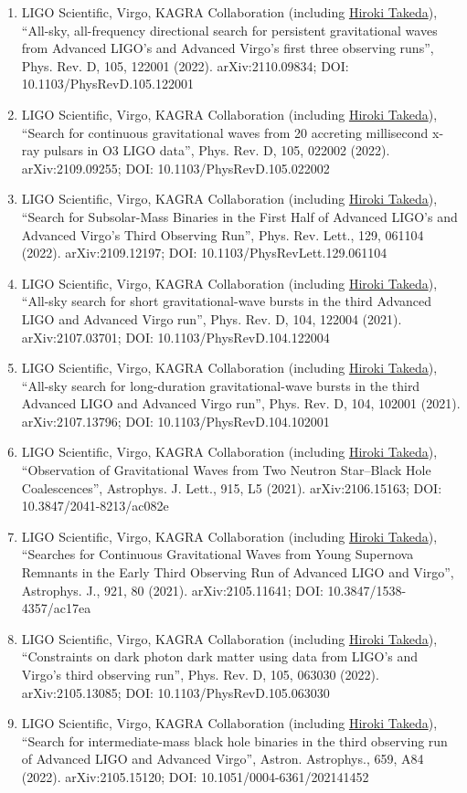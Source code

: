 \documentclass[uplatex, 12pt]{article}
\begin{document}
\begin{enumerate}
\item LIGO Scientific, Virgo, KAGRA Collaboration (including \uline{Hiroki Takeda}), “All-sky, all-frequency directional search for persistent gravitational waves from Advanced LIGO's and Advanced Virgo's first three observing runs”, Phys. Rev. D, 105, 122001 (2022). arXiv:2110.09834; DOI: 10.1103/PhysRevD.105.122001
\item LIGO Scientific, Virgo, KAGRA Collaboration (including \uline{Hiroki Takeda}), “Search for continuous gravitational waves from 20 accreting millisecond x-ray pulsars in O3 LIGO data”, Phys. Rev. D, 105, 022002 (2022). arXiv:2109.09255; DOI: 10.1103/PhysRevD.105.022002
\item LIGO Scientific, Virgo, KAGRA Collaboration (including \uline{Hiroki Takeda}), “Search for Subsolar-Mass Binaries in the First Half of Advanced LIGO's and Advanced Virgo's Third Observing Run”, Phys. Rev. Lett., 129, 061104 (2022). arXiv:2109.12197; DOI: 10.1103/PhysRevLett.129.061104
\item LIGO Scientific, Virgo, KAGRA Collaboration (including \uline{Hiroki Takeda}), “All-sky search for short gravitational-wave bursts in the third Advanced LIGO and Advanced Virgo run”, Phys. Rev. D, 104, 122004 (2021). arXiv:2107.03701; DOI: 10.1103/PhysRevD.104.122004
\item LIGO Scientific, Virgo, KAGRA Collaboration (including \uline{Hiroki Takeda}), “All-sky search for long-duration gravitational-wave bursts in the third Advanced LIGO and Advanced Virgo run”, Phys. Rev. D, 104, 102001 (2021). arXiv:2107.13796; DOI: 10.1103/PhysRevD.104.102001
\item LIGO Scientific, Virgo, KAGRA Collaboration (including \uline{Hiroki Takeda}), “Observation of Gravitational Waves from Two Neutron Star--Black Hole Coalescences”, Astrophys. J. Lett., 915, L5 (2021). arXiv:2106.15163; DOI: 10.3847/2041-8213/ac082e
\item LIGO Scientific, Virgo, KAGRA Collaboration (including \uline{Hiroki Takeda}), “Searches for Continuous Gravitational Waves from Young Supernova Remnants in the Early Third Observing Run of Advanced LIGO and Virgo”, Astrophys. J., 921, 80 (2021). arXiv:2105.11641; DOI: 10.3847/1538-4357/ac17ea
\item LIGO Scientific, Virgo, KAGRA Collaboration (including \uline{Hiroki Takeda}), “Constraints on dark photon dark matter using data from LIGO's and Virgo's third observing run”, Phys. Rev. D, 105, 063030 (2022). arXiv:2105.13085; DOI: 10.1103/PhysRevD.105.063030
\item LIGO Scientific, Virgo, KAGRA Collaboration (including \uline{Hiroki Takeda}), “Search for intermediate-mass black hole binaries in the third observing run of Advanced LIGO and Advanced Virgo”, Astron. Astrophys., 659, A84 (2022). arXiv:2105.15120; DOI: 10.1051/0004-6361/202141452

\end{enumerate}
\end{document}
